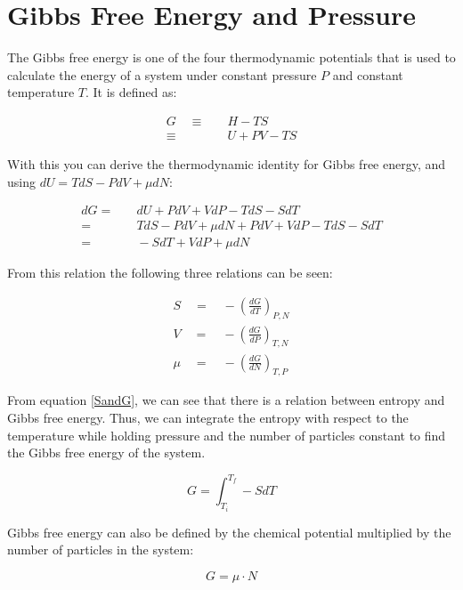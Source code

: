 \documentclass[../hand-in3.tex]{subfiles}
\begin{document}
\section{Gibbs Free Energy and Pressure}

The Gibbs free energy is one of the four thermodynamic potentials that is used to calculate the energy of a system under constant pressure $P$ and constant temperature $T$. It is defined as:

\begin{align} 
G \quad \equiv& \quad H - TS \nonumber \\
  \equiv& \quad U +PV -TS \label{Gibbs}	
\end{align}

With this you can derive the thermodynamic identity for Gibbs free energy, and using $dU = TdS - PdV + \mu dN$:

\begin{align}
dG =& \quad dU + PdV + VdP -TdS -SdT \nonumber \\
   =& \quad TdS - PdV + \mu dN + PdV + VdP -TdS -SdT \nonumber \\ 
   =& \quad -SdT + VdP + \mu dN
\end{align}

From this relation the following three relations can be seen:

\begin{align}
S \quad = \quad - \left( \frac{dG}{dT} \right)_{P,N} \label{SandG} \\
V \quad = \quad - \left( \frac{dG}{dP} \right)_{T,N} \nonumber \\
\mu \quad = \quad - \left( \frac{dG}{dN} \right)_{T,P} \nonumber 
\end{align}

From equation \ref{SandG}, we can see that there is a relation between entropy and Gibbs free energy. Thus, we can integrate the entropy with respect to the temperature while holding pressure and the number of particles constant to find the Gibbs free energy of the system.

\begin{equation}
G = \int_{T_i}^{T_f} -SdT
\end{equation}

Gibbs free energy can also be defined by the chemical potential multiplied by the number of particles in the system:

\begin{equation}
G = \mu \cdot N
\end{equation} 
\end{document}
